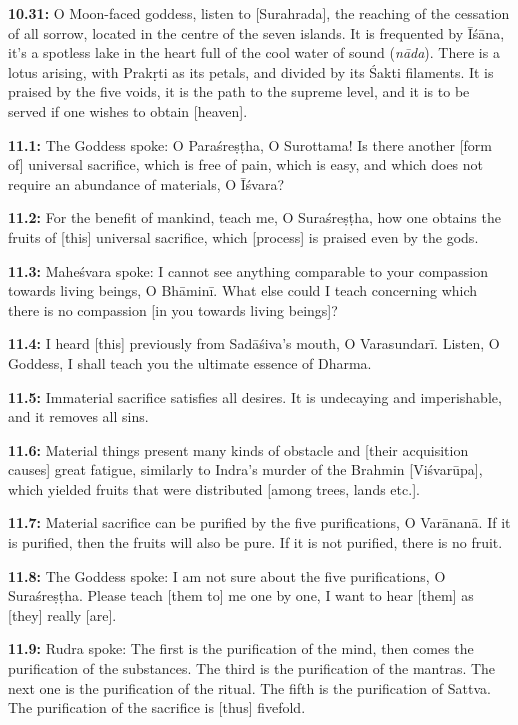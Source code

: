 \documentclass{article}
\newcommand{\vsnum}[1]{\textbf{#1}}
\newcommand{\skt}[1]{\textit{#1}}
\begin{document}
\vsnum{10.31: }O Moon-faced goddess, listen to [Surahrada], the reaching of the cessation of all sorrow, located in the centre of the seven islands. It is frequented by Īśāna, it's a spotless lake in the heart full of the cool water of sound (\skt{nāda}). There is a lotus arising, with Prakṛti as its petals, and divided by its Śakti filaments. It is praised by the five voids, it is the path to the supreme level, and it is to be served if one wishes to obtain [heaven].


\vsnum{11.1: }The Goddess spoke: O Paraśreṣṭha, O Surottama! Is there another [form of] universal sacrifice, which is free of pain, which is easy, and which does not require an abundance of materials, O Īśvara?

\vsnum{11.2: }For the benefit of mankind, teach me, O Suraśreṣṭha, how one obtains the fruits of [this] universal sacrifice, which [process] is praised even by the gods.

\vsnum{11.3: }Maheśvara spoke: I cannot see anything comparable to your compassion towards living beings, O Bhāminī. What else could I teach concerning which there is no compassion [in you towards living beings]?

\vsnum{11.4: }I heard [this] previously from Sadāśiva's mouth, O Varasundarī. Listen, O Goddess, I shall teach you the ultimate essence of Dharma.

\vsnum{11.5: }Immaterial sacrifice satisfies all desires. It is undecaying and imperishable, and it removes all sins.

\vsnum{11.6: }Material things present many kinds of obstacle and [their acquisition causes] great fatigue, similarly to Indra's murder of the Brahmin [Viśvarūpa], which yielded fruits that were distributed [among trees, lands etc.].

\vsnum{11.7: }Material sacrifice can be purified by the five purifications, O Varānanā. If it is purified, then the fruits will also be pure. If it is not purified, there is no fruit.

\vsnum{11.8: }The Goddess spoke: I am not sure about the five purifications, O Suraśreṣṭha. Please teach [them to] me one by one, I want to hear [them] as [they] really [are].

\vsnum{11.9: }Rudra spoke: The first is the purification of the mind, then comes the purification of the substances. The third is the purification of the mantras. The next one is the purification of the ritual. The fifth is the purification of Sattva. The purification of the sacrifice is [thus] fivefold.
\end{document}
